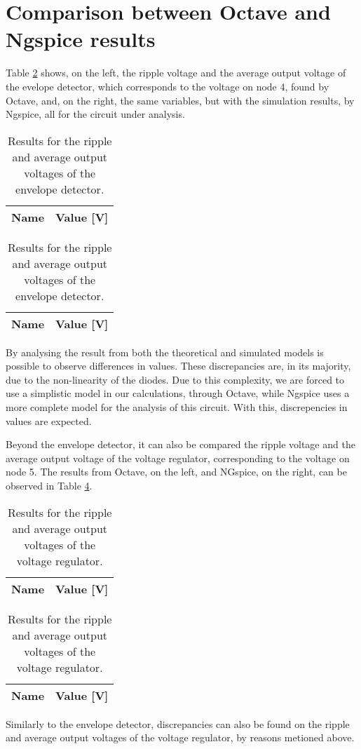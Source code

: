 \section{Comparison between Octave and Ngspice results}
\label{sec:comparison}

\par Table \ref{tab:envelope} shows, on the left, the ripple voltage and the
average output voltage of the evelope detector, which corresponds to the voltage
on node 4, found by Octave, and, on the right, the same variables, but with the
simulation results, by Ngspice, all for the circuit under analysis.

\begin{table}[htb!]
  \centering
  \begin{tabular}{|l|r|}
      \hline    
      {\bf Name} & {\bf Value [V]} \\ \hline
      
  \end{tabular}
\quad
  \begin{tabular}{|l|r|}
    \hline    
    {\bf Name} & {\bf Value [V]} \\ \hline
    
  \end{tabular}
  \caption{Results for the ripple and average output voltages of the envelope detector.}
  \label{tab:envelope}
\end{table}

\par By analysing the result from both the theoretical and simulated models is possible
to observe differences in values. These discrepancies are, in its majority, due to the
non-linearity of the diodes. Due to this complexity, we are forced to use a simplistic
model in our calculations, through Octave, while Ngspice uses a more complete model for
the analysis of this circuit. With this, discrepencies in values are expected.

\par Beyond the envelope detector, it can also be compared the ripple voltage and the
average output voltage of the voltage regulator, corresponding to the voltage on node
5. The results from Octave, on the left, and NGspice, on the right, can be observed in
Table \ref{tab:regulator}.

\begin{table}[htb!]
  \centering
  \begin{tabular}{|l|r|}
      \hline    
      {\bf Name} & {\bf Value [V]} \\ \hline
      
  \end{tabular}
\quad
  \begin{tabular}{|l|r|}
    \hline    
    {\bf Name} & {\bf Value [V]} \\ \hline
    
  \end{tabular}
  \caption{Results for the ripple and average output voltages of the voltage regulator.}
  \label{tab:regulator}
\end{table}

\par Similarly to the envelope detector, discrepancies can also be found on the ripple and
average output voltages of the voltage regulator, by reasons metioned above.\par

